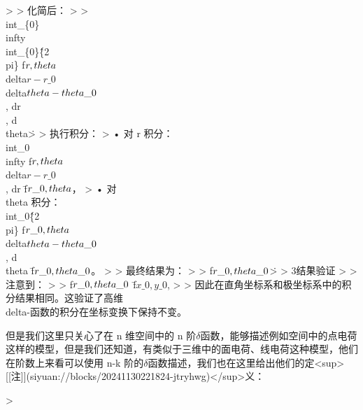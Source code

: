 \documentclass[lang=cn,10pt,newtx,bibend=biber,device=pad]{elegantbook}
\begin{document}
>
> 化简后：
>
> \\int\_\{0\}\^\\infty \\int\_\{0\}\^\{2\\pi\} f\(r, \\theta\) \\delta\(r - r\_0\) \\delta\(\\theta - \\theta\_0\) \\, dr \\, d\\theta\.
>
> 执行积分：  
> 	•	对 r 积分：\\int\_0\^\\infty f\(r, \\theta\) \\delta\(r - r\_0\) \\, dr \= f\(r\_0, \\theta\)，  
> 	•	对 \\theta 积分：\\int\_0\^\{2\\pi\} f\(r\_0, \\theta\) \\delta\(\\theta - \\theta\_0\) \\, d\\theta \= f\(r\_0, \\theta\_0\)。
>
> 最终结果为：
>
> f\(r\_0, \\theta\_0\)\.
>
> 3\. 结果验证
>
> 注意到：
>
> f\(r\_0, \\theta\_0\) \= f\(x\_0, y\_0\),
>
> 因此在直角坐标系和极坐标系中的积分结果相同。这验证了高维 \\delta-函数的积分在坐标变换下保持不变。

但是我们这里只关心了在 n 维空间中的 n 阶$\delta$函数，能够描述例如空间中的点电荷这样的模型，但是我们还知道，有类似于三维中的面电荷、线电荷这种模型，他们在阶数上来看可以使用 n-k 阶的$\delta$函数描述，我们也在这里给出他们的定<sup>[[注]](siyuan://blocks/20241130221824-jtryhwg)</sup>义：

> ‍
\end{document}
